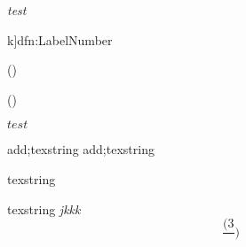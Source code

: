 \begin{itemize}
\end{itemize}

\textit{test}

\begin{dfn}k]{dfn:Label}{Number}
\end{dfn}

()



()


\texorpdfstring{$test$}{word}

add;texstring
add;texstring





texstring

texstring
\textit{jkkk}
\[\frac{(3}{})\]

